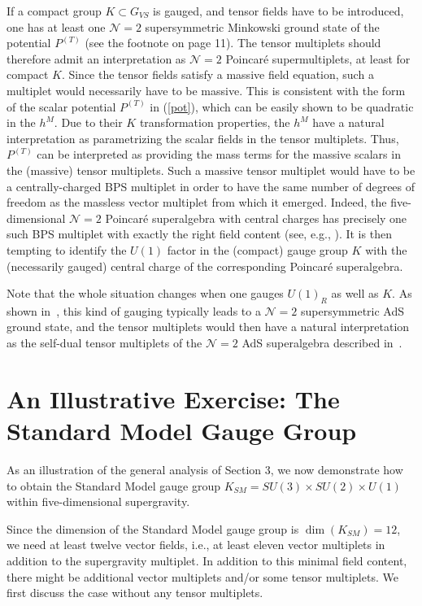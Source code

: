 \documentclass[a4paper,11pt]{article}
\begin{document}
If a compact group $K\subset G_{VS}$ is gauged, and tensor fields have to be
introduced, one has at least one $\mathcal{N}=2$ supersymmetric Minkowski
ground state of the potential $P^{(T)}$ (see the footnote on page 11). The
tensor multiplets should therefore admit an interpretation as
$\mathcal{N}=2$ Poincar\'{e} supermultiplets, at least for compact $K$. 
Since the tensor fields satisfy a massive field equation, such a multiplet
would necessarily have to be massive. This is consistent with the form of
the scalar potential $P^{(T)}$ in (\ref{pot}), which can be easily shown
to be quadratic in the $h^{M}$. Due to their $K$ transformation
properties, the $h^{M}$ have a natural interpretation as parametrizing the
scalar fields in the tensor multiplets. Thus, $P^{(T)}$ can be interpreted
as providing the mass terms for the massive scalars in the (massive) 
tensor multiplets. Such a massive tensor multiplet would have to be a
centrally-charged BPS multiplet in order to have the same number of
degrees of freedom as the massless vector multiplet from which it emerged. 
Indeed, the five-dimensional $\mathcal{N}=2$ Poincar\'{e} superalgebra
with central charges has precisely one such BPS multiplet with exactly the
right field content (see, e.g., \cite{Strathdee,PTvN}).  It is then
tempting to identify the $U(1)$ factor in the (compact)  gauge group $K$
with the (necessarily gauged) central charge of the corresponding
Poincar\'{e} superalgebra.

Note that the whole situation changes when one gauges $U(1)_R$ as well as
$K$. As shown in~\cite{GZ2}, this kind of gauging typically leads to a
$\mathcal{N} = 2$ supersymmetric AdS ground state, and the tensor
multiplets would then have a natural interpretation as the self-dual
tensor multiplets of the $\mathcal{N} = 2$ AdS superalgebra described
in~\cite{GRW}.

\section{An Illustrative Exercise: The Standard Model Gauge Group}

As an illustration of the general analysis of Section 3, we now
demonstrate how to obtain the Standard Model gauge group
$K_{SM}=SU(3)\times SU(2) \times U(1)$ within five-dimensional
supergravity.

Since the dimension of the Standard Model gauge group is
$\dim(K_{SM})=12$, we need at least twelve vector fields, i.e., at least
eleven vector multiplets in addition to the supergravity multiplet. In
addition to this minimal field content, there might be additional vector
multiplets and/or some tensor multiplets.  We first discuss the case
without any tensor multiplets.
\end{document}
